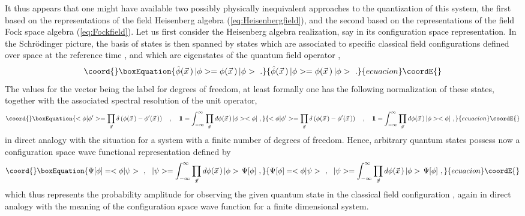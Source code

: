 \documentclass[a4paper,11pt]{article}
\def\one{1\hskip -.37em 1}
\begin{document}
It thus appears that one might have available two possibly physically 
inequivalent approaches to the quantization of this system, the first based 
on the representations of the field Heisenberg algebra 
(\ref{eq:Heisenbergfield}), and the second based on the representations of 
the field Fock space algebra (\ref{eq:Fockfield}). Let us first consider 
the Heisenberg algebra realization, say in its configuration space 
representation. In the Schr\"odinger picture, the basis of states is then 
spanned by states \myHighlight{$|\phi>$}\coordHE{} which are associated to specific classical field 
configurations \coordHE{} defined over space at the reference time 
\coordHE{}, and which are eigenstates of the quantum field operator 
\coordHE{},
\begin{equation}\coord{}\boxEquation{
\hat{\phi}(\vec{x}\,)\,|\phi>=\phi(\vec{x}\,)\,|\phi>\ .
}{
\hat{\phi}(\vec{x}\,)\,|\phi>=\phi(\vec{x}\,)\,|\phi>\ .
}{ecuacion}\coordE{}\end{equation}
The values for the vector \coordHE{} being the label for degrees of freedom,
at least formally one has the following normalization of these states,
together with the associated spectral resolution of the unit operator,
\begin{equation}\coord{}\boxEquation{
<\phi|\phi'>=\prod_{\vec{x}}\delta\left(\phi(\vec{x}\,)-\phi'(\vec{x}\,)\right)
\ \ \ ,\ \ \ 
\one=\int_{-\infty}^\infty\prod_{\vec{x}}d\phi(\vec{x}\,)\,|\phi><\phi|\ ,
}{
<\phi|\phi'>=\prod_{\vec{x}}\delta\left(\phi(\vec{x}\,)-\phi'(\vec{x}\,)\right)
\ \ \ ,\ \ \ 
\one=\int_{-\infty}^\infty\prod_{\vec{x}}d\phi(\vec{x}\,)\,|\phi><\phi|\ ,
}{ecuacion}\coordE{}\end{equation}
in direct analogy with the situation for a system with a finite number
of degrees of freedom. Hence, arbitrary quantum states \myHighlight{$|\psi>$}\coordHE{} possess now 
a configuration space wave functional representation \myHighlight{$\Psi[\phi]$}\coordHE{} defined by
\begin{equation}\coord{}\boxEquation{
\Psi[\phi]=<\phi|\psi>\ \ ,\ \ 
|\psi>=\int_{-\infty}^\infty\prod_{\vec{x}}d\phi(\vec{x}\,)\,|\phi>\,\Psi[\phi]
\ ,
}{
\Psi[\phi]=<\phi|\psi>\ \ ,\ \ 
|\psi>=\int_{-\infty}^\infty\prod_{\vec{x}}d\phi(\vec{x}\,)\,|\phi>\,\Psi[\phi]
\ ,
}{ecuacion}\coordE{}\end{equation}
which thus represents the probability amplitude for observing the given
quantum state \myHighlight{$|\psi>$}\coordHE{} in the classical field configuration \coordHE{},
again in direct analogy with the meaning of the configuration space
wave function for a finite dimensional system.
\end{document}
